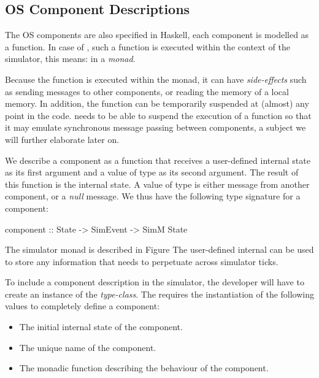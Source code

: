 \subsection{OS Component Descriptions}

The OS components are also specified in Haskell, each component is
modelled as a function. In case of \soosim, such a function is
executed within the context of the simulator, this means: in a
\emph{monad}.

Because the function is executed within the monad, it can have
\emph{side-effects} such as sending messages to other components, or
reading the memory of a local memory.  In addition, the function can
be temporarily suspended at (almost) any point in the code.  \soosim
needs to be able to suspend the execution of a function so that it may
emulate synchronous message passing between components, a subject we
will further elaborate later on.

We describe a component as a function that receives a user-defined
internal state as its first argument and a value of type 
as its second argument.  The result of this function is the internal
state.  A value of type  is either message from another
component, or a \emph{null} message.  We thus have the following type
signature for a component: 
\begin{code}
component :: State -> SimEvent -> SimM State
\end{code}

The simulator monad  is described in Figure 
The user-defined internal  can be used to store any
information that needs to perpetuate across simulator ticks.

To include a component description in the simulator, the developer
will have to create an instance of the  \emph{type-class}.
The  requires the instantiation of the following values to completely define a component:

\begin{itemize}
  \item The initial internal state of the component.
  \item The unique name of the component.
  \item The monadic function describing the behaviour of the component.
\end{itemize}

